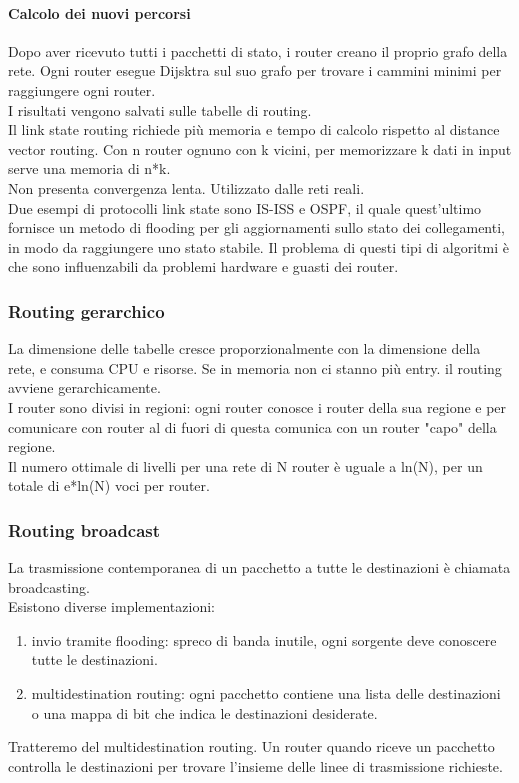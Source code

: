 \documentclass{article}
\begin{document}
\paragraph{Calcolo dei nuovi percorsi}
Dopo aver ricevuto tutti i pacchetti di stato, i router creano il proprio grafo della rete. Ogni router esegue Dijsktra sul suo grafo per trovare i cammini minimi per raggiungere ogni router. \\
I risultati vengono salvati sulle tabelle di routing.\\
Il link state routing richiede più memoria e tempo di calcolo rispetto al distance vector routing. Con n router ognuno con k vicini, per memorizzare k dati in input serve una memoria di n*k.\\
Non presenta convergenza lenta.
Utilizzato dalle reti reali.\\
Due esempi di protocolli link state sono IS-ISS e OSPF, il quale quest'ultimo fornisce un metodo di flooding per gli aggiornamenti sullo stato dei collegamenti, in modo da raggiungere uno stato stabile. 
Il problema di questi tipi di algoritmi è che sono influenzabili da problemi hardware e guasti dei router. 
\subsubsection{Routing gerarchico}
La dimensione delle tabelle cresce proporzionalmente con la dimensione della rete, e consuma CPU e risorse. Se in memoria non ci stanno più entry. il routing avviene gerarchicamente. \\
I router sono divisi in regioni: ogni router conosce i router della sua regione e per comunicare con router al di fuori di questa comunica con un router "capo" della regione.\\
Il numero ottimale di livelli per una rete di N router è uguale a ln(N), per un totale di e*ln(N) voci per router. 
\subsubsection{Routing broadcast}
La trasmissione contemporanea di un pacchetto a tutte le destinazioni è chiamata broadcasting. \\
Esistono diverse implementazioni:
\begin{enumerate}
    \item invio tramite flooding: spreco di banda inutile, ogni sorgente deve conoscere tutte le destinazioni.
    \item multidestination routing: ogni pacchetto contiene una lista delle destinazioni o una mappa di bit che indica le destinazioni desiderate. 
\end{enumerate}
Tratteremo del multidestination routing. Un router quando riceve un pacchetto controlla le destinazioni per trovare l'insieme delle linee di trasmissione richieste. 
\end{document}
